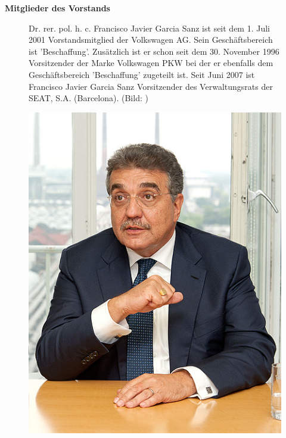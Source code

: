 \documentclass[12pt]{article}
\begin{document}
\textbf{Mitglieder des Vorstands}
\begin{figure}[here!]
	\centering
	\begin{minipage}[h]{0.65\textwidth}
		Dr. rer. pol. h. c. Francisco Javier Garcia Sanz ist seit dem 1. Juli 2001 Vorstandsmitglied der Volkswagen AG. Sein Geschäftsbereich ist 'Beschaffung'. Zusätzlich ist er schon seit dem 30. November 1996 Vorsitzender der Marke Volkswagen PKW bei der er ebenfalls dem Geschäftsbereich 'Beschaffung' zugeteilt ist. Seit Juni 2007 ist Francisco Javier Garcia Sanz Vorsitzender des Verwaltungsrats der SEAT, S.A. (Barcelona). (Bild: \cite{fspic} )
	\end{minipage}
		\begin{minipage}[h]{0.10\textwidth}
		\hspace{1cm}
	\end{minipage}
	\begin{minipage}[h]{0.20\textwidth}
		\centering
		\includegraphics[width=1.0\textwidth]{images/FranciscoSanz.jpg}
		\label{fig:vorstandvw1}
	\end{minipage}
\end{figure}
\end{document}
